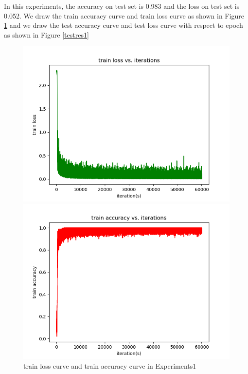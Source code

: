 \documentclass{elegantbook}
\begin{document}
In this experiments, the accuracy on test set is 0.983 and the loss on test set is 0.052. We draw the train accuracy curve and train loss curve as shown in Figure \ref{trainres1} and we draw the test accuracy curve and test loss curve with respect to epoch as shown in Figure \ref{testres1}

\begin{figure}[!h]
	\centering
	\begin{minipage}[t]{0.48\textwidth}
		\centering
		\includegraphics[width=\textwidth]{../results/trainloss1}
	\end{minipage}
	\begin{minipage}[t]{0.48\textwidth}
		\centering
		\includegraphics[width=\textwidth]{../results/trainacc1}
	\end{minipage}
	\caption{\label{trainres1}train loss curve and train accuracy curve in Experiments1}
\end{figure}
\end{document}
